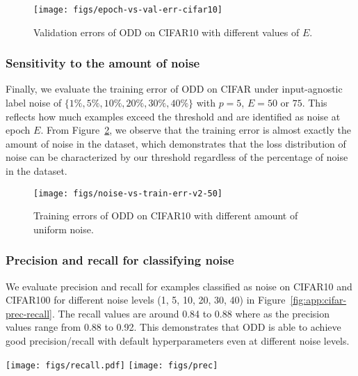 \documentclass[a4paper,11pt]{article}
\begin{document}
\begin{figure}[h]
\centering
\texttt{[image: figs/epoch-vs-val-err-cifar10]}
\caption{Validation errors of \textsc{ODD} on CIFAR10 with different values of $E$.
}
\label{fig:app:epoch-vs-val-error}
\end{figure}

\subsubsection{Sensitivity to the amount of noise} Finally, we evaluate the training error of \textsc{ODD} on CIFAR under input-agnostic label noise of $\{1\%, 5\%, 10\%, 20\%, 30\%, 40\%\}$ with $p = 5$, $E = 50$ or $75$. This reflects how much examples exceed the threshold and are identified as noise at epoch $E$. From Figure~\ref{fig:app:noise-vs-train-error}, we observe that the training error is almost exactly the amount of noise in the dataset, which demonstrates that the loss distribution of noise can be characterized by our threshold regardless of the percentage of noise in the dataset.

\begin{figure}
\centering
\texttt{[image: figs/noise-vs-train-err-v2-50]}
\caption{Training errors of \textsc{ODD} on CIFAR10 with different amount of uniform noise.
}
\label{fig:app:noise-vs-train-error}
\end{figure}















\subsubsection{Precision and recall for classifying noise} We evaluate precision and recall for examples classified as noise on CIFAR10 and CIFAR100 for different noise levels (1, 5, 10, 20, 30, 40) in Figure~\ref{fig:app:cifar-prec-recall}. The recall values are around 0.84 to 0.88 where as the precision values range from 0.88 to 0.92. This demonstrates that \textsc{ODD} is able to achieve good precision/recall with default hyperparameters even at different noise levels.

\begin{figure*}[htbp]
\centering
\texttt{[image: figs/recall.pdf]}
\hspace*{0.05\textwidth}
\texttt{[image: figs/prec]}
\caption{Recall and precision for \textsc{ODD} on CIFAR10 and CIFAR100 with different levels of uniform random noise. }
\label{fig:app:cifar-prec-recall}
\end{figure*}
\end{document}
